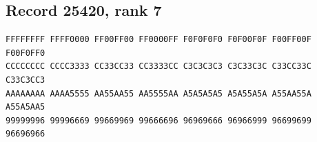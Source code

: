 \documentclass[11pt]{amsart}
\theoremstyle{definition}
\theoremstyle{remark}
\numberwithin{equation}{section}
\numberwithin{table}{section}
\begin{document}
\subsection*{Record 25420, rank 7}
\begin{Verbatim}[fontsize=\scriptsize,xleftmargin=1em]
FFFFFFFF FFFF0000 FF00FF00 FF0000FF F0F0F0F0 F0F00F0F F00FF00F F00F0FF0
CCCCCCCC CCCC3333 CC33CC33 CC3333CC C3C3C3C3 C3C33C3C C33CC33C C33C3CC3
AAAAAAAA AAAA5555 AA55AA55 AA5555AA A5A5A5A5 A5A55A5A A55AA55A A55A5AA5
99999996 99996669 99669969 99666696 96969666 96966999 96699699 96696966
\end{Verbatim}
\par
{}\par
\end{document}
